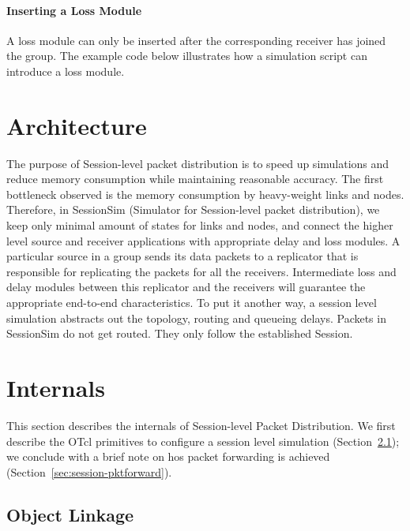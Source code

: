 \paragraph{Inserting a Loss Module}
A loss module can only be inserted after the corresponding receiver
has joined the group.  The example code below illustrates how
a simulation script can introduce a loss module.

\section{Architecture}
\label{sec:session-arch}
The purpose of Session-level packet distribution is to
speed up simulations and reduce memory consumption while 
maintaining reasonable accuracy.
The first bottleneck observed is the memory consumption by heavy-weight
links and nodes.  Therefore, in SessionSim (Simulator for Session-level
packet distribution), we keep only minimal amount of 
states for links and nodes, and connect the higher level source and 
receiver applications with appropriate delay and loss modules.
A particular source in a group sends its data packets
to a replicator that is responsible for replicating the packets
for all the receivers.
Intermediate loss and delay modules between this replicator and the receivers
will guarantee the appropriate end-to-end characteristics.
To put it another way, a session level simulation
abstracts out the topology, routing and queueing delays.
Packets in SessionSim do not get routed.  
They only follow the established Session.

\section{Internals}
This section describes the internals of Session-level Packet Distribution.
We first describe the OTcl primitives to configure a session level
simulation (Section~\ref{sec:session-objlink});
we conclude with a brief note on hos packet forwarding is achieved
(Section~\ref{sec:session-pktforward}).

\subsection{Object Linkage}
\label{sec:session-objlink}

